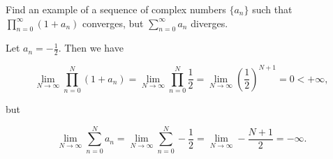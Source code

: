 Find an example of a sequence of complex numbers $\{a_n\}$ such that $\prod\limits_{n=0}^{\infty} (1 + a_n)$ converges, 
but $\sum\limits_{n=0}^{\infty} a_n$ diverges.

\begin{solution}
  Let $a_n = -\frac{1}{2}$. Then we have

  $$
  \lim_{N \to \infty} \prod_{n=0}^{N} (1 + a_n) = \lim_{N \to \infty} \prod_{n=0}^{N} \frac{1}{2} 
                                                = \lim_{N \to \infty} \left( \frac{1}{2} \right)^{N+1} 
                                                = 0
                                                < +\infty,
  $$

  but 

  $$
  \lim_{N \to \infty}\sum_{n=0}^{N} a_n = \lim_{N \to \infty}\sum_{n=0}^{N} -\frac{1}{2} 
                                        = \lim_{N \to \infty} -\frac{N+1}{2} 
                                        = -\infty.
  $$
  \ \\
\end{solution}

